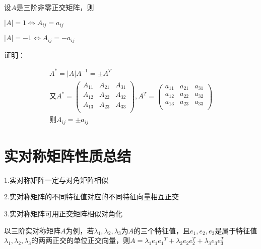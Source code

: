 \documentclass[lang=cn,10pt]{elegantbook}
\begin{document}
\begin{conclusion}
	设$A$是三阶非零正交矩阵，则
	
	$|A|=1
	\Longleftrightarrow 
	A_{ij}=a_{ij}$
	
	$|A|=-1
	\Longleftrightarrow 
	A_{ij}=-a_{ij}$
\end{conclusion}

证明：

\begin{equation*}
	\begin{split}
		A^*=|A|A^{-1}=\pm A^{T} 
		\\
		\text{又}A^*=\left( \begin{matrix}
			A_{11}&		A_{21}&		A_{31}\\
			A_{12}&		A_{22}&		A_{32}\\
			A_{13}&		A_{23}&		A_{33}\\
		\end{matrix} \right) ,A^T=\left( \begin{matrix}
			a_{11}&		a_{21}&		a_{31}\\
			a_{12}&		a_{22}&		a_{32}\\
			a_{13}&		a_{23}&		a_{33}\\
		\end{matrix} \right) \\
		\text{则}A_{ij}=\pm a_{ij}
	\end{split}
\end{equation*}
\section{实对称矩阵性质总结}	
	\begin{conclusion}
		1.实对称矩阵一定与对角矩阵相似
		
		2.实对称矩阵的不同特征值对应的不同特征向量相互正交
		
		3.实对称矩阵可用正交矩阵相似对角化
	\end{conclusion}
	
	\begin{theorem}[谱分解定理]
		以三阶实对称矩阵$A$为例，若$\lambda_{1},\lambda_{2},\lambda_{3}$为$A$的三个特征值，且$e_{1},e_{2},e_{3}$是属于特征值$\lambda_{1},\lambda_{2},\lambda_{3}$的两两正交的单位正交向量，则$A=\lambda _1e_1{e_1}^T+\lambda _2e_2e_{2}^{T}+\lambda _3e_3e_{3}^{T}$
	\end{theorem}
	
\end{document}
